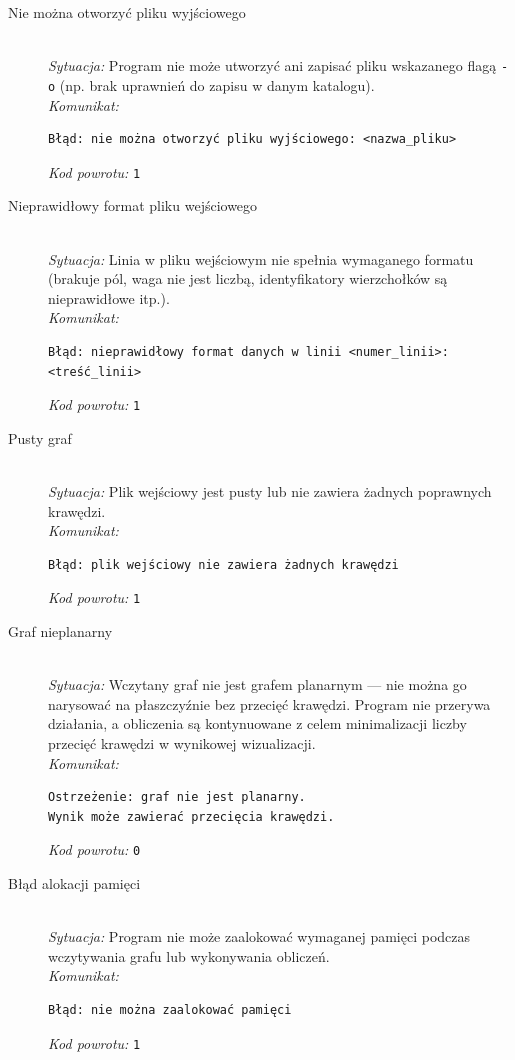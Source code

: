 \documentclass[12pt]{article}
\begin{document}
\begin{description}
	\item[Nie można otworzyć pliku wyjściowego]
	      \hfill \\
	      \textit{Sytuacja:} Program nie może utworzyć ani zapisać pliku wskazanego
	      flagą \texttt{-o} (np. brak uprawnień do zapisu w danym katalogu). \\
	      \textit{Komunikat:}
	      \begin{verbatim}
Błąd: nie można otworzyć pliku wyjściowego: <nazwa_pliku>
    \end{verbatim}
	      \textit{Kod powrotu:} \texttt{1}

	\item[Nieprawidłowy format pliku wejściowego]
	      \hfill \\
	      \textit{Sytuacja:} Linia w pliku wejściowym nie spełnia wymaganego formatu
	      (brakuje pól, waga nie jest liczbą, identyfikatory wierzchołków są
	      nieprawidłowe itp.). \\
	      \textit{Komunikat:}
	      \begin{verbatim}
Błąd: nieprawidłowy format danych w linii <numer_linii>: <treść_linii>
    \end{verbatim}
	      \textit{Kod powrotu:} \texttt{1}

	\item[Pusty graf]
	      \hfill \\
	      \textit{Sytuacja:} Plik wejściowy jest pusty lub nie zawiera żadnych
	      poprawnych krawędzi. \\
	      \textit{Komunikat:}
	      \begin{verbatim}
Błąd: plik wejściowy nie zawiera żadnych krawędzi
    \end{verbatim}
	      \textit{Kod powrotu:} \texttt{1}

	\item[Graf nieplanarny]
	      \hfill \\
	      \textit{Sytuacja:} Wczytany graf nie jest grafem planarnym — nie można go
	      narysować na płaszczyźnie bez przecięć krawędzi. Program nie przerywa
	      działania, a obliczenia są kontynuowane z celem minimalizacji liczby
	      przecięć krawędzi w wynikowej wizualizacji. \\
	      \textit{Komunikat:}
	      \begin{verbatim}
Ostrzeżenie: graf nie jest planarny. 
Wynik może zawierać przecięcia krawędzi.
    \end{verbatim}
	      \textit{Kod powrotu:} \texttt{0}

	\item[Błąd alokacji pamięci]
	      \hfill \\
	      \textit{Sytuacja:} Program nie może zaalokować wymaganej pamięci podczas
	      wczytywania grafu lub wykonywania obliczeń. \\
	      \textit{Komunikat:}
	      \begin{verbatim}
Błąd: nie można zaalokować pamięci
    \end{verbatim}
	      \textit{Kod powrotu:} \texttt{1}

\end{description}
\end{document}
